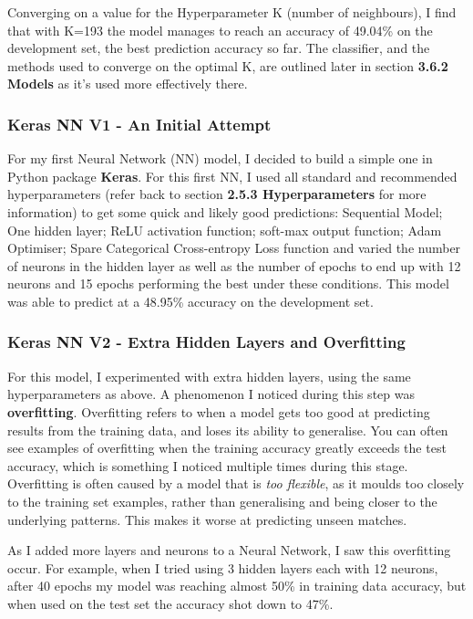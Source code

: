\documentclass[12pt,a4paper,twoside,openright]{report}
\begin{document}
Converging on a value for the Hyperparameter K (number of neighbours), I find that with K=193 the model manages to reach an accuracy of 49.04\% on the development set, the best prediction accuracy so far. The classifier, and the methods used to converge on the optimal K, are outlined later in section \textbf{3.6.2 Models} as it's used more effectively there.

\subsubsection{Keras NN V1 - An Initial Attempt}

For my first Neural Network (NN) model, I decided to build a simple one in Python package \textbf{Keras}. For this first NN, I used all standard and recommended hyperparameters (refer back to section \textbf{2.5.3 Hyperparameters} for more information) to get some quick and likely good predictions: Sequential Model; One hidden layer; ReLU activation function; soft-max output function; Adam Optimiser; Spare Categorical Cross-entropy Loss function and varied the number of neurons in the hidden layer as well as the number of epochs to end up with 12 neurons and 15 epochs performing the best under these conditions. This model was able to predict at a 48.95\% accuracy on the development set.

\subsubsection{Keras NN V2 - Extra Hidden Layers and Overfitting}

For this model, I experimented with extra hidden layers, using the same hyperparameters as above. A phenomenon I noticed during this step was \textbf{overfitting}. Overfitting refers to when a model gets too good at predicting results from the training data, and loses its ability to generalise. You can often see examples of overfitting when the training accuracy greatly exceeds the test accuracy, which is something I noticed multiple times during this stage. Overfitting is often caused by a model that is \textit{too flexible}, as it moulds too closely to the training set examples, rather than generalising and being closer to the underlying patterns. This makes it worse at predicting unseen matches. 

As I added more layers and neurons to a Neural Network, I saw this overfitting occur. For example, when I tried using 3 hidden layers each with 12 neurons, after 40 epochs my model was reaching almost 50\% in training data accuracy, but when used on the test set the accuracy shot down to 47\%.
\end{document}
